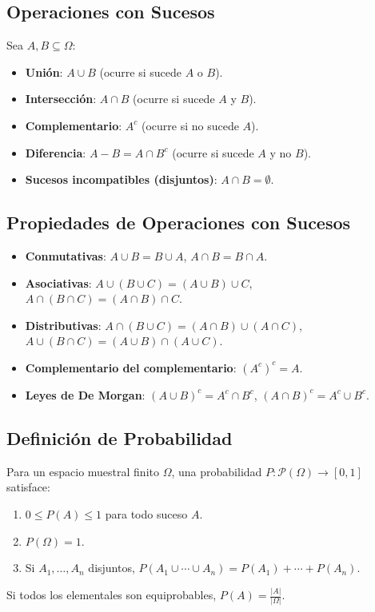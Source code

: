 \documentclass{article}
\begin{document}
\subsection{Operaciones con Sucesos}
Sea \(A, B \subseteq \Omega\):
\begin{itemize}
    \item \textbf{Unión}: \(A \cup B\) (ocurre si sucede \(A\) o \(B\)).
    \item \textbf{Intersección}: \(A \cap B\) (ocurre si sucede \(A\) y \(B\)).
    \item \textbf{Complementario}: \(A^c\) (ocurre si no sucede \(A\)).
    \item \textbf{Diferencia}: \(A - B = A \cap B^c\) (ocurre si sucede \(A\) y no \(B\)).
    \item \textbf{Sucesos incompatibles (disjuntos)}: \(A \cap B = \emptyset\).
\end{itemize}

\subsection{Propiedades de Operaciones con Sucesos}
\begin{itemize}
    \item \textbf{Conmutativas}: \(A \cup B = B \cup A\), \(A \cap B = B \cap A\).
    \item \textbf{Asociativas}: \(A \cup (B \cup C) = (A \cup B) \cup C\), \(A \cap (B \cap C) = (A \cap B) \cap C\).
    \item \textbf{Distributivas}: \(A \cap (B \cup C) = (A \cap B) \cup (A \cap C)\), \(A \cup (B \cap C) = (A \cup B) \cap (A \cup C)\).
    \item \textbf{Complementario del complementario}: \({(A^c)}^c = A\).
    \item \textbf{Leyes de De Morgan}: \({(A \cup B)}^c = A^c \cap B^c\), \({(A \cap B)}^c = A^c \cup B^c\).
\end{itemize}

\subsection{Definición de Probabilidad}
Para un espacio muestral finito \(\Omega\), una probabilidad \(P: \mathcal{P}(\Omega) \to [0,1]\) satisface:
\begin{enumerate}
    \item \(0 \leq P(A) \leq 1\) para todo suceso \(A\).
    \item \(P(\Omega) = 1\).
    \item Si \(A_1, \dots, A_n\) disjuntos, \(P(A_1 \cup \cdots \cup A_n) = P(A_1) + \cdots + P(A_n)\).
\end{enumerate}
Si todos los elementales son equiprobables, \(P(A) = \frac{|A|}{|\Omega|}\).
\end{document}
